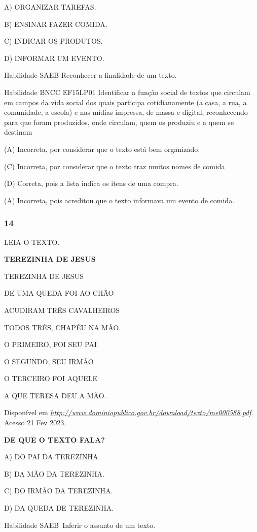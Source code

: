 \begin{escola}
A) ORGANIZAR TAREFAS.

B) ENSINAR FAZER COMIDA.

C) INDICAR OS PRODUTOS.

D) INFORMAR UM EVENTO.

Habilidade SAEB Reconhecer a finalidade de um texto.

Habilidade BNCC EF15LP01 Identificar a função social de textos que
circulam em campos da vida social dos quais participa cotidianamente (a
casa, a rua, a comunidade, a escola) e nas mídias impressa, de massa e
digital, reconhecendo para que foram produzidos, onde circulam, quem os
produziu e a quem se destinam

(A) Incorreta, por considerar que o texto está bem organizado.

(C) Incorreta, por considerar que o texto traz muitos nomes de comida

(D) Correta, pois a lista indica os itens de uma compra.

(A) Incorreta, pois acreditou que o texto informava um evento de comida.

\subsubsection{14}\label{section-70}

LEIA O TEXTO.

\textbf{TEREZINHA DE JESUS}

TEREZINHA DE JESUS

DE UMA QUEDA FOI AO CHÃO

ACUDIRAM TRÊS CAVALHEIROS

TODOS TRÊS, CHAPÉU NA MÃO.

O PRIMEIRO, FOI SEU PAI

O SEGUNDO, SEU IRMÃO

O TERCEIRO FOI AQUELE

A QUE TERESA DEU A MÃO.

Disponível em
\href{http://www.dominiopublico.gov.br/download/texto/me000588.pdf}{\emph{http://www.dominiopublico.gov.br/download/texto/me000588.pdf}}.
Acesso 21 Fev 2023.

\textbf{DE QUE O TEXTO FALA?}

A) DO PAI DA TEREZINHA.

B) DA MÃO DA TEREZINHA.

C) DO IRMÃO DA TEREZINHA.

D) DA QUEDA DE TEREZINHA.

Habilidade SAEB~Inferir o assunto de um texto.


\end{escola}
